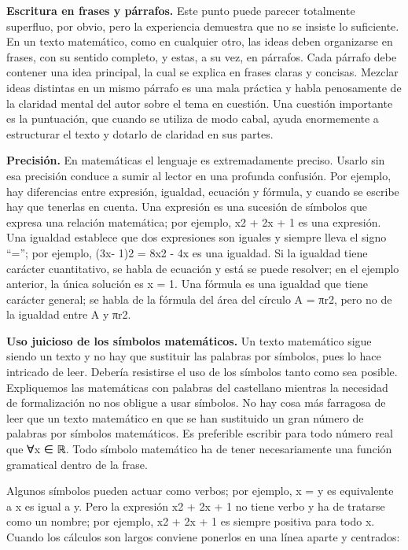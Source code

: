 \hspace{5mm}\textbf{Escritura en frases y párrafos.}
Este punto puede parecer totalmente superfluo, por obvio, pero la experiencia demuestra que no se insiste lo suficiente. En un texto matemático, como en cualquier otro, las ideas deben organizarse en frases, con su sentido completo, y estas, a su vez, en párrafos. Cada párrafo debe contener una idea principal, la cual se explica en frases claras y concisas. Mezclar ideas distintas en un mismo párrafo es una mala práctica y habla penosamente de la claridad mental del autor sobre el tema en cuestión. Una cuestión importante es la puntuación, que cuando se utiliza de modo cabal, ayuda enormemente a estructurar el texto y dotarlo de claridad en sus partes.

\hspace{5mm}\textbf{Precisión.}
En matemáticas el lenguaje es extremadamente preciso. Usarlo sin esa precisión conduce a sumir al lector en una profunda confusión. Por ejemplo, hay diferencias entre expresión, igualdad, ecuación y fórmula, y cuando se escribe hay que tenerlas en cuenta. Una expresión es una sucesión de símbolos que expresa una relación matemática; por ejemplo, x2 + 2x + 1 es una expresión. Una igualdad establece que dos expresiones son iguales y siempre lleva el signo “=”; por ejemplo, (3x- 1)2 = 8x2 - 4x es una igualdad. Si la igualdad tiene carácter cuantitativo, se habla de ecuación y está se puede resolver; en el ejemplo anterior, la única solución es x = 1. Una fórmula es una igualdad que tiene carácter general; se habla de la fórmula del área del círculo A = πr2, pero no de la igualdad entre A y πr2.

\hspace{5mm}\textbf{Uso juicioso de los símbolos matemáticos.}
Un texto matemático sigue siendo un texto y no hay que sustituir las palabras por símbolos, pues lo hace intricado de leer. Debería resistirse el uso de los símbolos tanto como sea posible. Expliquemos las matemáticas con palabras del castellano mientras la necesidad de formalización no nos obligue a usar símbolos. No hay cosa más farragosa de leer que un texto matemático en que se han sustituido un gran número de palabras por símbolos matemáticos. Es preferible escribir para todo número real que ∀x ∈ ℝ. Todo símbolo matemático ha de tener necesariamente una función gramatical dentro de la frase.

Algunos símbolos pueden actuar como verbos; por ejemplo, x = y es equivalente a x es igual a y. Pero la expresión x2 + 2x + 1 no tiene verbo y ha de tratarse como un nombre; por ejemplo, x2 + 2x + 1 es siempre positiva para todo x. Cuando los cálculos son largos conviene ponerlos en una línea aparte y centrados:

